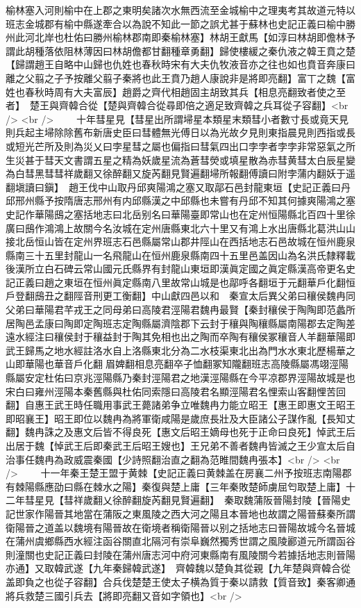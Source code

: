 榆林塞入河則榆中在上郡之東明矣諸次水無西流至金城榆中之理夷考其故道元特以班志金城郡有榆中縣遂牽合以為說不知此一節之誤尤甚于蘇林也史記正義曰榆中勝州此河北岸也杜佑曰勝州榆林郡南即秦榆林塞】林胡王獻馬【如淳曰林胡即儋林予謂此胡種落依阻林薄因曰林胡儋都甘翻種章勇翻】歸使樓緩之秦仇液之韓王賁之楚【歸謂趙王自略中山歸也仇姓也春秋時宋有大夫仇牧液音亦之往也如也賁音奔康曰離之父翦之子予按離父翦子秦將也此王賁乃趙人康說非是將即亮翻】富丅之魏【富姓也春秋時周有大夫富辰】趙爵之齊代相趙固主胡致其兵【相息亮翻致者使之至者】　楚王與齊韓合從【楚與齊韓合從尋即倍之適足致齊韓之兵耳從子容翻】<br />
<br />
　　十年彗星見【彗星出所謂埽星本類星末類彗小者數寸長或竟天見則兵起主埽除除舊布新唐史臣曰彗體無光傅日以為光故夕見則東指晨見則西指或長或短光芒所及則為災乂曰孛星彗之屬也偏指曰彗氣四出口孛孛者孛孛非常惡氣之所生災甚于彗天文書謂五星之精為妖歲星流為蒼彗熒或填星散為赤彗黄彗太白辰星變為白彗黑彗彗祥歲翻又徐醉翻又旋芮翻見賢遍翻埽所報翻傅讀曰附孛蒲内翻妖于遥翻塡讀曰鎭】　趙王伐中山取丹邱爽陽鴻之塞又取鄗石邑封龍東垣【史記正義曰丹邱邢州縣予按隋唐志邢州有内邱縣漢之中邱縣也未嘗有丹邱不知其何據爽陽鴻之塞史記作華陽䲭之塞括地志曰北岳别名曰華陽臺即常山也在定州恒陽縣北百四十里徐廣曰䲭作鴻鴻上故關今名汝城在定州唐縣東北六十里又有鴻上水出唐縣北葛洪山山接北岳恒山皆在定州界班志石邑縣屬常山郡井陘山在西括地志石邑故城在恒州鹿泉縣南三十五里封龍山一名飛龍山在恒州鹿泉縣南四十五里邑盖因山為名洪氏隸釋載後漢所立白石碑云常山國元氏縣界有封龍山東垣即漢眞定國之眞定縣漢高帝更名史記正義曰趙之東垣在恒州眞定縣南八里故常山城是也鄗呼各翻垣于元翻華戶化翻恒戶登翻䲭丑之翻陘音刑更工衡翻】中山獻四邑以和　秦宣太后異父弟曰穰侯魏冉同父弟曰華陽君芊戎王之同母弟曰高陵君涇陽君魏冉最賢【秦封穰侯于陶陶即范蠡所居陶邑孟康曰陶即定陶班志定陶縣屬濟陰郡下云封于穰與陶穰縣屬南陽郡去定陶差遠水經注曰穰侯封于穰益封于陶其免相也出之陶而卒陶有穰侯冢穰音人羊翻華陽即武王歸馬之地水經註洛水自上洛縣東北分為二水枝渠東北出為門水水東北歷楊華之山即華陽也華音戶化翻眉婢翻相息亮翻卒子恤翻冢知隴翻班志高陵縣屬馮翊涇陽縣屬安定杜佑曰京兆涇陽縣乃秦封涇陽君之地漢涇陽縣在今平凉郡界涇陽故城是也宋白曰雍州涇陽本秦舊縣與杜佑同索隱曰高陵君名顯涇陽君名悝索山客翻悝苦回翻】自惠王武王時任職用事武王薨諸弟争立唯魏冉力能立昭王【惠王即惠文王昭王即昭襄王】昭王即位以魏冉為將軍衛咸陽是歲庶長壯及大臣諸公子謀作亂【長知丈翻】魏冉誅之及惠文后皆不得良死【惠文后昭王嫡母也死于正命曰良死】悼武王后出居于魏【悼武王后即秦武王后昭王嫂也】王兄弟不善者魏冉皆滅之王少宣太后自治事任魏冉為政威震秦國【少詩照翻治直之翻為范睢間魏冉張本】<br />
<br />
　　十一年秦王楚王盟于黄棘【史記正義曰黄棘盖在房襄二州予按班志南陽郡有棘陽縣應劭曰縣在棘水之陽】秦復與楚上庸【三年秦敗楚師虜屈匄取楚上庸】十二年彗星見【彗祥歲翻乂徐醉翻旋芮翻見賢遍翻】　秦取魏蒲阪晉陽封陵【晉陽史記世家作陽晉其地當在蒲阪之東風陵之西大河之陽且本晉地也故謂之陽晉蘇秦所謂衛陽晉之道盖以魏境有陽晉故在衛境者稱衛陽晉以别之括地志曰晉陽故城今名晉城在蒲州虞鄉縣西水經注函谷關直北隔河有崇阜巍然獨秀世謂之風陵酈道元所謂函谷則潼關也史記正義曰封陵在蒲州唐志河中府河東縣南有風陵關今若據括地志則晉陽亦通】又取韓武遂【九年秦歸韓武遂】　齊韓魏以楚負其從親【九年楚與齊韓合從盖即負之也從子容翻】合兵伐楚楚王使太子横為質于秦以請救【質音致】秦客卿通將兵救楚三國引兵去【將即亮翻又音如字領也】<br />
